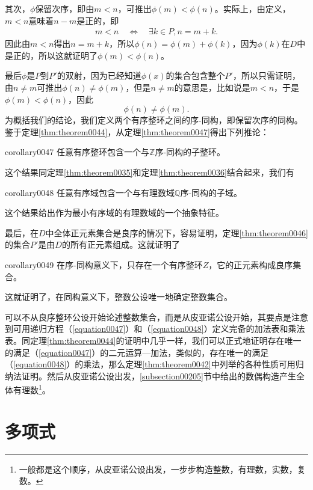 其次，$\phi$保留次序，即由$m < n$，可推出$\phi(m) < \phi(n)$。实际上，由定义，$m<n$意味着$n-m$是正的，即
\begin{gather}\label{equation0049}
m < n \quad \Leftrightarrow\quad \exists k \in P, n=m+k.
\end{gather}
因此由$m<n$得出$n=m+k$，所以$\phi(n)=\phi(m)+\phi(k)$，因为$\phi(k)$在$D$中是正的，所以这就证明了$\phi(m)<\phi(n)$。

最后$\phi$是$P$到$P'$的双射，因为已经知道$\phi(x)$的集合包含整个$P'$，所以只需证明，由$n \neq m$可推出$\phi(n) \neq \phi(m)$，但是$n \neq m$的意思是，比如说是$m < n$，于是$\phi(m) < \phi(n)$，因此
\[
\phi(n) \neq \phi(m).
\]
为概括我们的结论，我们定义两个有序整环之间的序-同构，即保留次序的同构。鉴于定理\ref{thm:theorem0044}，从定理\ref{thm:theorem0047}得出下列推论：
\begin{corollary}{}{corollary0047}
任意有序整环包含一个与$\mathbb{Z}$序-同构的子整环。
\end{corollary}

这个结果同定理\ref{thm:theorem0035}和定理\ref{thm:theorem0036}结合起来，我们有
\begin{corollary}{}{corollary0048}
任意有序域包含一个与有理数域$\mathbb{Q}$序-同构的子域。
\end{corollary}

这个结果给出作为最小有序域的有理数域的一个抽象特征。

最后，在$D$中全体正元素集合是良序的情况下，容易证明，定理\ref{thm:theorem0046}的集合$P'$是由$D$的所有正元素组成。这就证明了
\begin{corollary}{}{corollary0049}
在序-同构意义下，只存在一个有序整环$Z$，它的正元素构成良序集合。
\end{corollary}

这就证明了，在同构意义下，整数公设唯一地确定整数集合。

可以不从良序整环公设开始论述整数集合，而是从皮亚诺公设开始，其要点是注意到可用递归方程（\ref{equation0047}）和（\ref{equation0048}）定义完备的加法表和乘法表。同定理\ref{thm:theorem0044}的证明中几乎一样，我们可以正式地证明存在唯一的满足（\ref{equation0047}）的二元运算---加法，类似的，存在唯一的满足（\ref{equation0048}）的乘法，那么定理\ref{thm:theorem0042}中列举的各种性质可用归纳法证明。然后从皮亚诺公设出发，\ref{subsection00205}节中给出的数偶构造产生全体有理数\footnote{一般都是这个顺序，从皮亚诺公设出发，一步步构造整数，有理数，实数，复数。}。

\section{多项式}\label{section00103}

